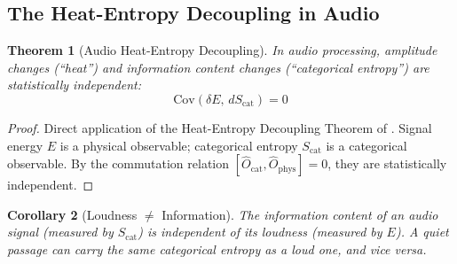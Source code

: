 \documentclass[twocolumn,10pt]{article}
\newtheorem{theorem}{Theorem}[section]
\newtheorem{corollary}[theorem]{Corollary}
\theoremstyle{remark}
\newcommand{\Ocat}{\hat{O}_{\mathrm{cat}}}
\newcommand{\Ophys}{\hat{O}_{\mathrm{phys}}}
\newcommand{\Scat}{S_{\mathrm{cat}}}
\begin{document}
\subsection{The Heat-Entropy Decoupling in Audio}

\begin{theorem}[Audio Heat-Entropy Decoupling]
\label{thm:audio_decoupling}
In audio processing, amplitude changes (``heat'') and information content changes (``categorical entropy'') are statistically independent:
\begin{equation}
    \mathrm{Cov}(\delta E, \, d\Scat) = 0
    \label{eq:audio_decoupling}
\end{equation}
\end{theorem}

\begin{proof}
Direct application of the Heat-Entropy Decoupling Theorem of \cite{sachikonye2026thermodynamics}. Signal energy $E$ is a physical observable; categorical entropy $\Scat$ is a categorical observable. By the commutation relation $[\Ocat, \Ophys] = 0$, they are statistically independent.
\end{proof}

\begin{corollary}[Loudness $\neq$ Information]
\label{cor:loudness_information}
The information content of an audio signal (measured by $\Scat$) is independent of its loudness (measured by $E$). A quiet passage can carry the same categorical entropy as a loud one, and vice versa.
\end{corollary}
\end{document}
